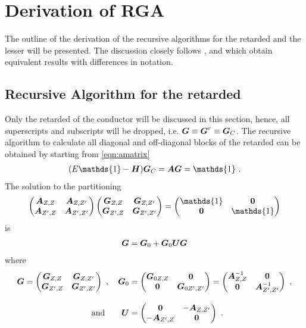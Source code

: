\chapter{Derivation of RGA}
\label{app:RGA}
The outline of the derivation of the recursive algorithms for the retarded and the lesser \gfnc{} will be presented. The discussion closely follows \cite{JApplPhys.91.2343}, \cite{JApplPhys.81.7845} and \cite{Wimmer2009Thesis} which obtain equivalent results with differences in notation.
\section{Recursive Algorithm for the retarded \cgfnc{}}
Only the retarded \gfnc{} of the conductor will be discussed in this section, hence, all superscripts and subscripts will be dropped, i.e. $\boldsymbol{G} \equiv \boldsymbol{G}^r\equiv \boldsymbol{G}_C$. The recursive algorithm to calculate all diagonal and off-diagonal blocks of the retarded \gfnc{} can be obtained by starting from \cref{eqn:amatrix}
\begin{align}
  (E\mathds{1}-\mat{H})\mat{G}_C = \mat{A}\mat{G}=\mathds{1}\ .
  \label{eqn:amatrixppendix}
\end{align}
The solution to the partitioning
\begin{align}
  \begin{pmatrix} \mat{A}_{Z,Z} & \mat{A}_{Z,Z'}\\
		  \mat{A}_{Z',Z} & \mat{A}_{Z',Z'}
  \end{pmatrix}
  \begin{pmatrix} \mat{G}_{Z,Z} & \mat{G}_{Z,Z'}\\
		  \mat{G}_{Z',Z} & \mat{G}_{Z',Z'}
  \end{pmatrix} = 
  \begin{pmatrix} \mathds{1} & \mat{0}\\
		  \mat{0} & \mathds{1}
  \end{pmatrix}
\end{align}
is
\begin{align}
  \boldsymbol{G}=\boldsymbol{G}_0+\boldsymbol{G}_0\boldsymbol{U}\boldsymbol{G}
  \label{eqn:dysonequationappendix}
\end{align}
where 
\begin{align}
  \boldsymbol{G} = 
  \begin{pmatrix} \boldsymbol{G}_{Z,Z} & \boldsymbol{G}_{Z,Z'}\\
		  \boldsymbol{G}_{Z',Z} & \boldsymbol{G}_{Z',Z'}
  \end{pmatrix}\ ,\quad
  \boldsymbol{G}_0 &= 
  \begin{pmatrix} \boldsymbol{G}_{0 Z,Z} & \boldsymbol{0}\\
		  \boldsymbol{0} & \boldsymbol{G}_{0 Z',Z'}
  \end{pmatrix}=
  \begin{pmatrix} \boldsymbol{A}^{-1}_{Z,Z} & \boldsymbol{0}\\
		  \boldsymbol{0} & \boldsymbol{A}^{-1}_{Z',Z'}
  \end{pmatrix}\ ,\notag\\[3mm] 
  \text{and}\hspace{2em}
  \boldsymbol{U} &= 
  \begin{pmatrix} \boldsymbol{0} & -\boldsymbol{A}_{Z,Z'}\\
		  -\boldsymbol{A}_{Z',Z} & \boldsymbol{0}
  \end{pmatrix}\ .
\end{align}
